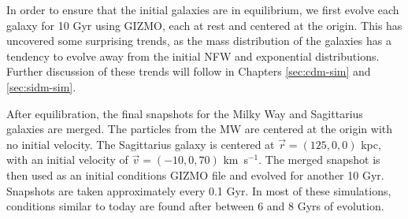 In order to ensure that the initial galaxies are in equilibrium, we first
evolve each galaxy for 10 Gyr using GIZMO, each at rest and centered at the
origin. This has uncovered some surprising trends, as the mass distribution
of the galaxies has a tendency to evolve away from the initial NFW and
exponential distributions. Further discussion of these trends will follow in
Chapters \ref{sec:cdm-sim} and \ref{sec:sidm-sim}.

After equilibration, the final snapshots for the Milky Way and Sagittarius
galaxies are merged. The particles from the MW are centered at the origin
with no initial velocity. The Sagittarius galaxy is centered at $\vec{r} =
(125, 0, 0)$ kpc, with an initial velocity of $\vec{v} = (-10, 0, 70)$
km~s$^{-1}$. The merged snapshot is then used as an initial conditions GIZMO
file and evolved for another 10 Gyr. Snapshots are taken approximately every
0.1 Gyr. In most of these simulations, conditions similar to today are found
after between 6 and 8 Gyrs of evolution.


